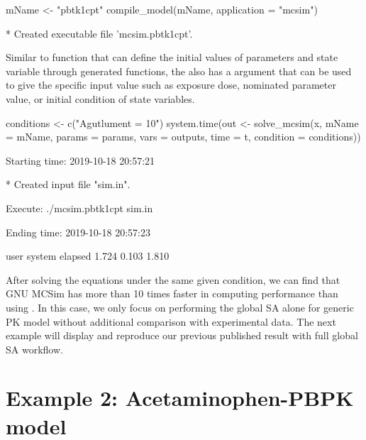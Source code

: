 \begin{Schunk}
\begin{Sinput}
mName <- "pbtk1cpt"
compile_model(mName, application = "mcsim")
\end{Sinput}
\begin{Soutput}
  * Created executable file 'mcsim.pbtk1cpt'.
\end{Soutput}
\end{Schunk}

Similar to  function that can define the initial values
of parameters and state variable through generated functions, the
 also has a  argument that can be
used to give the specific input value such as exposure dose, nominated
parameter value, or initial condition of state variables.

\begin{Schunk}
\begin{Sinput}
conditions <- c("Agutlument = 10") 
system.time(out <- solve_mcsim(x, mName = mName, params = params, 
                               vars = outputs, time = t, 
                               condition = conditions))
\end{Sinput}
\begin{Soutput}
  Starting time: 2019-10-18 20:57:21
\end{Soutput}
\begin{Soutput}
  * Created input file "sim.in".
\end{Soutput}
\begin{Soutput}
  Execute: ./mcsim.pbtk1cpt sim.in
\end{Soutput}
\begin{Soutput}
  Ending time: 2019-10-18 20:57:23
\end{Soutput}
\begin{Soutput}
     user  system elapsed 
    1.724   0.103   1.810
\end{Soutput}
\end{Schunk}

After solving the equations under the same given condition, we can find
that GNU MCSim has more than 10 times faster in computing performance
than using . In this case, we only focus on performing
the global SA alone for generic PK model without additional comparison
with experimental data. The next example will display and reproduce our
previous published result \citep{fphar201800588} with full global SA
workflow.

\hypertarget{example-2-acetaminophen-pbpk-model}{%
\section{Example 2: Acetaminophen-PBPK
model}\label{example-2-acetaminophen-pbpk-model}}


